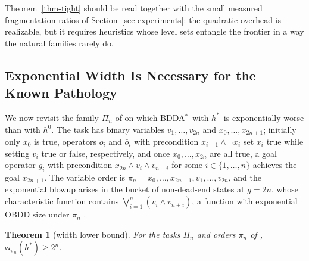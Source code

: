 \documentclass[letterpaper]{article}
\newcommand{\task}{\ensuremath{\Pi}}
\newcommand{\hstar}{\ensuremath{h^{*}}}
\newcommand{\hblind}{\ensuremath{h^{0}}}
\newcommand{\width}{\ensuremath{\mathsf{w}}}
\newcommand{\bddastar}{BDDA\ensuremath{^{*}}}
\theoremstyle{plain}
\newtheorem{theorem}{Theorem}
\theoremstyle{definition}
\theoremstyle{remark}
\begin{document}
Theorem~\ref{thm-tight} should be read together with the small measured
fragmentation ratios of Section~\ref{sec-experiments}: the quadratic
overhead is realizable, but it requires heuristics whose level sets
entangle the frontier in a way the natural families rarely do.

\subsection{Exponential Width Is Necessary for the Known Pathology}

We now revisit the family $\task_n$ of \citet{speck-et-al-icaps2020} on
which \bddastar\ with \hstar\ is exponentially worse than with \hblind.
The task has binary variables
$v_1, \dots, v_{2n}$ and $x_0, \dots, x_{2n+1}$; initially only $x_0$
is true, operators $o_i$ and $\bar o_i$ with precondition
$x_{i-1} \wedge \neg x_i$ set $x_i$ true while setting $v_i$ true or
false, respectively, and once $x_0, \dots, x_{2n}$ are all true, a goal
operator $g_i$ with precondition $x_{2n} \wedge v_i \wedge v_{n+i}$ for
some $i \in \{1, \dots, n\}$ achieves the goal
$x_{2n+1}$. The variable order is
$\pi_n = x_0, \dots, x_{2n+1}, v_1, \dots, v_{2n}$, and the exponential
blowup arises in the bucket of non-dead-end states at $g = 2n$, whose
characteristic function contains
$\bigvee_{i=1}^{n} (v_i \wedge v_{n+i})$, a function with exponential
OBDD size under $\pi_n$ \citep{kissmann-phd2012,speck-et-al-icaps2020}.

\begin{theorem}[width lower bound]
\label{thm-lb}
For the tasks $\task_n$ and orders $\pi_n$ of
\citet{speck-et-al-icaps2020},
$\width_{\pi_n}(\hstar) \geq 2^{n}$.
\end{theorem}
\end{document}
